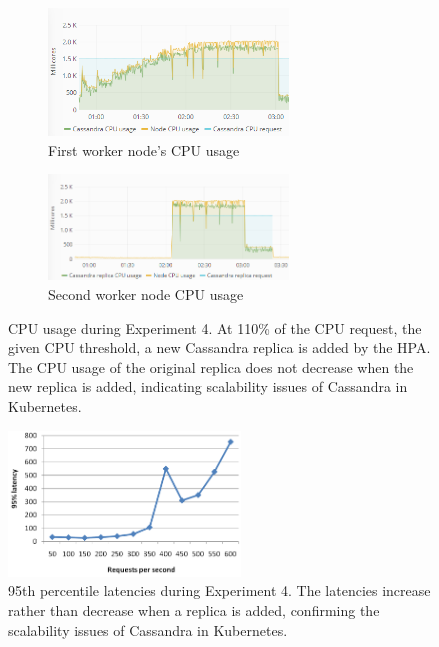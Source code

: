 \begin{figure}[H]
\centering
\begin{subfigure}[b]{\textwidth}
\centering
\includegraphics[width=0.70\textwidth]{Images/Experiments/CPU/Grafana/cpu-cas-hpa-li-1.PNG}
\caption{First worker node's CPU usage}
\label{fig:cpu-cas-hpa-li-1}
\end{subfigure}
\hfill
\begin{subfigure}[b]{\textwidth}
\centering
\includegraphics[width=0.70\textwidth]{Images/Experiments/CPU/Grafana/cpu-cas-hpa-li-2.PNG}
\caption{Second worker node CPU usage}
\label{fig:cpu-cas-hpa-li-2}
\end{subfigure}
\hfill
\caption{CPU usage during Experiment 4. At 110\% of the CPU request, the given CPU threshold, a new Cassandra replica is added by the HPA. The CPU usage of the original replica does not decrease when the new replica is added, indicating scalability issues of Cassandra in Kubernetes.}
\label{fig:cpu-cas-hpa-li}
\end{figure}

\begin{figure}[h]
\centering
\includegraphics[width=0.55\textwidth]{Images/Experiments/CPU/Latencies/lat-cas-hpa-li.PNG}
\caption{95th percentile latencies during Experiment 4. The latencies increase rather than decrease when a replica is added, confirming the scalability issues of Cassandra in Kubernetes.}
\label{fig:lat-cas-hpa-li}
\end{figure}

